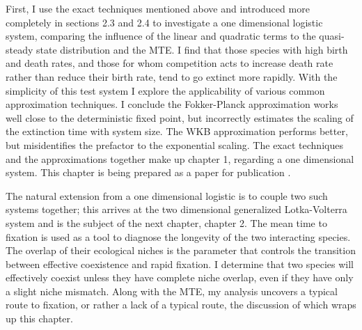 First, I use the exact techniques mentioned above and introduced more completely in sections 2.3 and 2.4 to investigate a one dimensional logistic system, comparing the influence of the linear and quadratic terms to the quasi-steady state distribution and the MTE. %
I find that those species with high birth and death rates, and those for whom competition acts to increase death rate rather than reduce their birth rate, tend to go extinct more rapidly. %
With the simplicity of this test system I explore the applicability of various common approximation techniques. 
I conclude the Fokker-Planck approximation works well close to the deterministic fixed point, but incorrectly estimates the scaling of the extinction time with system size. The WKB approximation performs better, but misidentifies the prefactor to the exponential scaling. %
The exact techniques and the approximations together make up chapter 1, regarding a one dimensional system. %
This chapter is being prepared as a paper for publication \cite{Badali2018a}. 

The natural extension from a one dimensional logistic is to couple two such systems together; this arrives at the two dimensional generalized Lotka-Volterra system and is the subject of the next chapter, chapter 2. %
The mean time to fixation is used as a tool to diagnose the longevity of the two interacting species. 
The overlap of their ecological niches is the parameter that controls the transition between effective coexistence and rapid fixation. 
I determine that two species will effectively coexist unless they have complete niche overlap, even if they have only a slight niche mismatch. %
Along with the MTE, my analysis uncovers a typical route to fixation, or rather a lack of a typical route, the discussion of which wraps up this chapter. %

